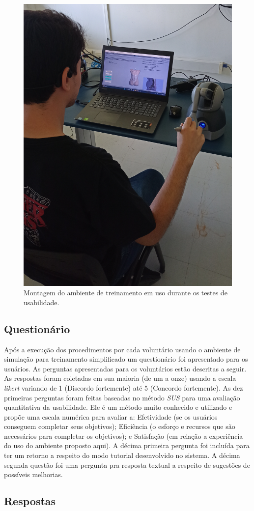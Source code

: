 \begin{figure}[ht!]
    \centering
    \includegraphics[width=0.4\linewidth]{capitulos/figuras/montagem-teste-usabilidade.jpg} 
    \caption{Montagem do ambiente de treinamento em uso durante os testes de usabilidade.}
    \label{fig:montagemTesteUsabilidade}
\end{figure}

\subsection{Questionário}
\label{sec:questionarioUsabilidade}

Após a execução dos procedimentos por cada voluntário usando o ambiente de simulação para treinamento simplificado um questionário foi apresentado para os usuários. As perguntas apresentadas para os voluntários estão descritas a seguir. As respostas foram coletadas em sua maioria (de um a onze) usando a escala \textit{likert} variando de 1 (Discordo fortemente) até 5 (Concordo fortemente). As dez primeiras perguntas foram feitas baseadas no método \textit{\acrfull{SUS}} \cite{Brooke2013} para uma avaliação quantitativa da usabilidade. Ele é um método muito conhecido e utilizado e propõe uma escala numérica para avaliar a: Efetividade (se os usuários conseguem completar seus objetivos); 
Eficiência (o esforço e recursos que são necessários para completar os objetivos); e
Satisfação (em relação a experiência do uso do ambiente proposto aqui). A décima primeira pergunta foi incluída para ter um retorno a respeito do modo tutorial desenvolvido no sistema. A décima segunda questão foi uma pergunta pra resposta textual a respeito de sugestões de possíveis melhorias.

\subsection{Respostas}
\label{sec:respostasUsabilidade}

